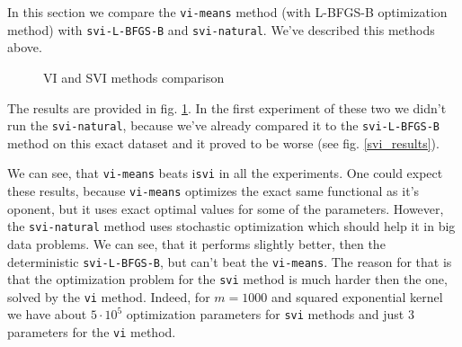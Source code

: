 In this section we compare the \lstinline{vi-means} method (with L-BFGS-B optimization method) with \lstinline{svi-L-BFGS-B} and \lstinline{svi-natural}. We've described this methods above. 

\begin{figure}[!h]
	\centering
	\subfloat{
		\scalebox{0.75}{
	    	
		}
	}
	\subfloat{
		\scalebox{0.73}{
			
		}
	}
	\caption{VI and SVI methods comparison}
	\label{visvi_results}
\end{figure}

The results are provided in fig. \ref{visvi_results}. In the first experiment of these two we didn't run the \lstinline{svi-natural}, because we've already compared it to the \lstinline{svi-L-BFGS-B} method on this exact dataset and it proved to be worse (see fig. \ref{svi_results}).

We can see, that \lstinline{vi-means} beats i\lstinline{svi} in all the experiments. One could expect these results, because \lstinline{vi-means} optimizes the exact same functional as it's oponent, but it uses exact optimal values for some of the parameters. However, the \lstinline{svi-natural} method uses stochastic optimization which should help it in big data problems. We can see, that it performs slightly better, then the deterministic \lstinline{svi-L-BFGS-B}, but can't beat the \lstinline{vi-means}. The reason for that is that the optimization problem for the \lstinline{svi} method is much harder then the one, solved by the \lstinline{vi} method. Indeed, for $m = 1000$ and squared exponential kernel we have about $5 \cdot 10^5$ optimization parameters for \lstinline{svi} methods and just $3$ parameters for the \lstinline{vi} method.
